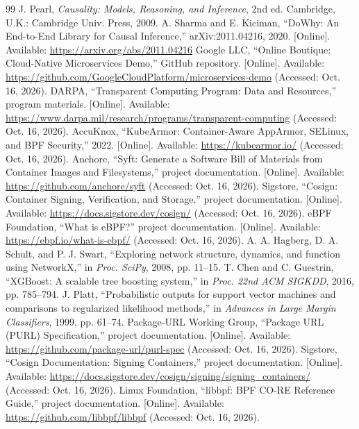 \documentclass[conference]{IEEEtran}
\begin{document}
\begin{thebibliography}{99}
 J. Pearl, \emph{Causality: Models, Reasoning, and Inference}, 2nd ed. Cambridge, U.K.: Cambridge Univ. Press, 2009.
 A. Sharma and E. Kiciman, ``DoWhy: An End-to-End Library for Causal Inference,'' arXiv:2011.04216, 2020. [Online]. Available: \url{https://arxiv.org/abs/2011.04216}
 Google LLC, ``Online Boutique: Cloud-Native Microservices Demo,'' GitHub repository. [Online]. Available: \url{https://github.com/GoogleCloudPlatform/microservices-demo} (Accessed: Oct. 16, 2026).
 DARPA, ``Transparent Computing Program: Data and Resources,'' program materials. [Online]. Available: \url{https://www.darpa.mil/research/programs/transparent-computing} (Accessed: Oct. 16, 2026).
 AccuKnox, ``KubeArmor: Container-Aware AppArmor, SELinux, and BPF Security,'' 2022. [Online]. Available: \url{https://kubearmor.io/} (Accessed: Oct. 16, 2026).
 Anchore, ``Syft: Generate a Software Bill of Materials from Container Images and Filesystems,'' project documentation. [Online]. Available: \url{https://github.com/anchore/syft} (Accessed: Oct. 16, 2026).
 Sigstore, ``Cosign: Container Signing, Verification, and Storage,'' project documentation. [Online]. Available: \url{https://docs.sigstore.dev/cosign/} (Accessed: Oct. 16, 2026).
 eBPF Foundation, ``What is eBPF?'' project documentation. [Online]. Available: \url{https://ebpf.io/what-is-ebpf/} (Accessed: Oct. 16, 2026).
 A. A. Hagberg, D. A. Schult, and P. J. Swart, ``Exploring network structure, dynamics, and function using NetworkX,'' in \emph{Proc. SciPy}, 2008, pp. 11--15.
 T. Chen and C. Guestrin, ``XGBoost: A scalable tree boosting system,'' in \emph{Proc. 22nd ACM SIGKDD}, 2016, pp. 785--794.
 J. Platt, ``Probabilistic outputs for support vector machines and comparisons to regularized likelihood methods,'' in \emph{Advances in Large Margin Classifiers}, 1999, pp. 61--74.
 Package-URL Working Group, ``Package URL (PURL) Specification,'' project documentation. [Online]. Available: \url{https://github.com/package-url/purl-spec} (Accessed: Oct. 16, 2026).
 Sigstore, ``Cosign Documentation: Signing Containers,'' project documentation. [Online]. Available: \url{https://docs.sigstore.dev/cosign/signing/signing_containers/} (Accessed: Oct. 16, 2026).
 Linux Foundation, ``libbpf: BPF CO-RE Reference Guide,'' project documentation. [Online]. Available: \url{https://github.com/libbpf/libbpf} (Accessed: Oct. 16, 2026).
\end{thebibliography}
\end{document}
